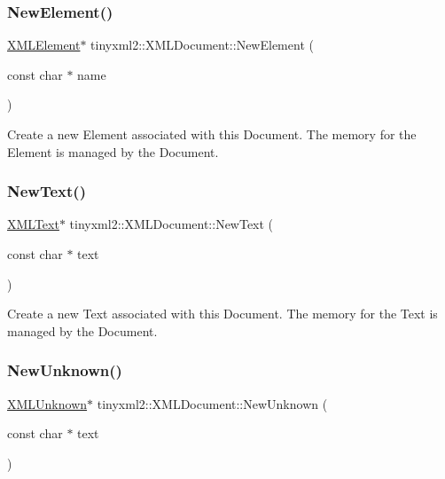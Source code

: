 \subsubsection{\texorpdfstring{NewElement()}{NewElement()}}
{\footnotesize\ttfamily \mbox{\hyperlink{classtinyxml2_1_1XMLElement}{X\+M\+L\+Element}}$\ast$ tinyxml2\+::\+X\+M\+L\+Document\+::\+New\+Element (\begin{DoxyParamCaption}\item[{const char $\ast$}]{name }\end{DoxyParamCaption})}

Create a new Element associated with this Document. The memory for the Element is managed by the Document. \mbox{\label{classtinyxml2_1_1XMLDocument_ab7e8b29ae4099092a8bb947da6361296}} 
\subsubsection{\texorpdfstring{NewText()}{NewText()}}
{\footnotesize\ttfamily \mbox{\hyperlink{classtinyxml2_1_1XMLText}{X\+M\+L\+Text}}$\ast$ tinyxml2\+::\+X\+M\+L\+Document\+::\+New\+Text (\begin{DoxyParamCaption}\item[{const char $\ast$}]{text }\end{DoxyParamCaption})}

Create a new Text associated with this Document. The memory for the Text is managed by the Document. \mbox{\label{classtinyxml2_1_1XMLDocument_a5385c937734ff6db9226ab707d2c7147}} 
\subsubsection{\texorpdfstring{NewUnknown()}{NewUnknown()}}
{\footnotesize\ttfamily \mbox{\hyperlink{classtinyxml2_1_1XMLUnknown}{X\+M\+L\+Unknown}}$\ast$ tinyxml2\+::\+X\+M\+L\+Document\+::\+New\+Unknown (\begin{DoxyParamCaption}\item[{const char $\ast$}]{text }\end{DoxyParamCaption})}

